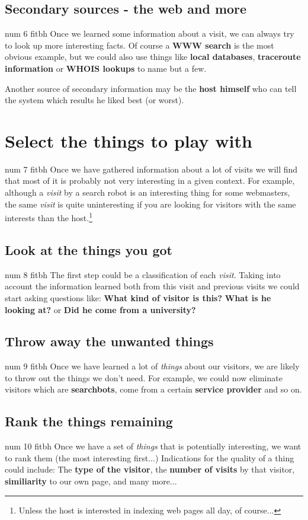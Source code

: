 \documentclass[a4paper]{danarticle}
\begin{document}
    \subsection*{Secondary sources - the web and more}
\pdfdest num 6 fitbh
      Once we learned some information about a visit, we can always try to look
      up more interesting facts. Of course a \textbf{WWW search} is the most
      obvious example, but we could also use things like \textbf{local
      databases}, \textbf{traceroute information} or \textbf{WHOIS lookups} to
      name but a few.
      
      Another source of secondary information may be the \textbf{host himself}
      who can tell the system which results he liked best (or worst).
  \section*{Select the things to play with}
\pdfdest num 7 fitbh
    Once we have gathered information about a lot of visits we will find that
    most of it is probably not very interesting in a given context. For example,
    although a \textit{visit} by a search robot is an interesting thing for some
    webmasters, the same \textit{visit} is quite uninteresting if you are looking
    for visitors with the same interests than the host.\footnote{Unless the host
    is interested in indexing web pages all day, of course...}
    \subsection*{Look at the things you got}
\pdfdest num 8 fitbh
      The first step could be a classification of each \textit{visit}. Taking into
      account the information learned both from this visit and previous visits
      we could start asking questions like: \textbf{What kind of visitor is
      this?} \textbf{What is he looking at?} or \textbf{Did he come from a
      university?}
    \subsection*{Throw away the unwanted things}
\pdfdest num 9 fitbh
      Once we have learned a lot of \textit{things} about our visitors, 
      we are likely to
      throw out the things we don't need. For example, we could now eliminate
      visitors which are \textbf{searchbots}, come from a certain
      \textbf{service provider} and so on.
    \subsection*{Rank the things remaining}
\pdfdest num 10 fitbh
      Once we have a set of \textit{things} that is potentially interesting, 
      we want to
      rank them (the most interesting first...) Indications for the quality of a
      thing could include: The \textbf{type of the visitor}, the \textbf{number
      of visits} by that visitor, \textbf{similiarity} to our own page, and many
      more...
\end{document}
